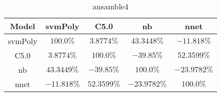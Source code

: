 \begin{table}[!ht]
	\centering
	\begin{tabular}{|c|c|c|c|c|}
		\hline
		Model & svmPoly & C5.0 & nb & nnet \\ \hline
		svmPoly & $100.0\%$ & $3.8774\%$ & $43.3448\%$ & $-11.818\%$ \\ \hline
		C5.0 & $3.8774\%$ & $100.0\%$ & $-39.85\%$ & $52.3599\%$ \\ \hline
		nb & $43.3449\%$ & $-39.85\%$ & $100.0\%$ & $-23.9782\%$ \\ \hline
		nnet & $-11.818\%$ & $52.3599\%$ & $-23.9782\%$ & $100.0\%$ \\ \hline
	\end{tabular}
	\caption{ansamble4}
	\label{tab:ansamble4}
\end{table}
